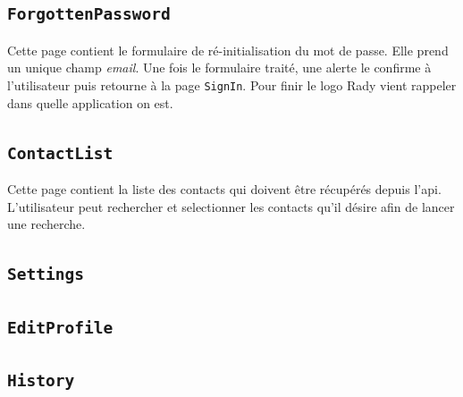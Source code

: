 \documentclass[french]{article}
\begin{document}
		\subsection{\texttt{ForgottenPassword}}
			Cette page contient le formulaire de ré-initialisation du mot de passe. Elle prend un unique champ \textit{email}. Une fois le formulaire traité, une alerte le confirme à l'utilisateur puis retourne à la page \texttt{SignIn}. Pour finir le logo Rady vient rappeler dans quelle application on est. 
			
		\subsection{\texttt{ContactList}}
			Cette page contient la liste des contacts qui doivent être récupérés depuis l'api. L'utilisateur peut rechercher et selectionner les contacts qu'il désire afin de lancer une recherche.
			
		\subsection{\texttt{Settings}}
			
		\subsection{\texttt{EditProfile}}
		
		\subsection{\texttt{History}}
			
		
			
\end{document}

